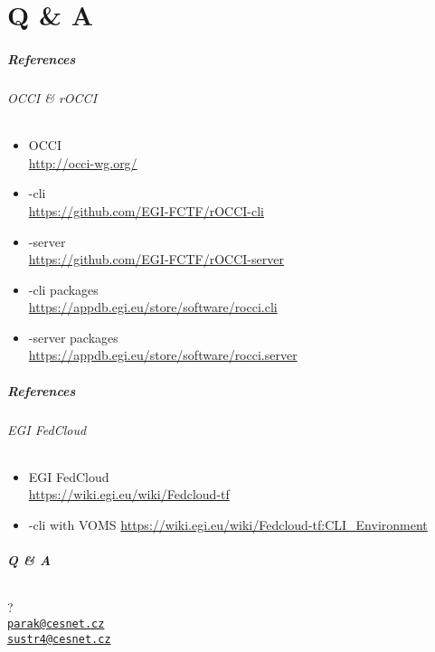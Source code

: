 \part{Q \& A}

\begin{frame}
  \frametitle{References}
  \framesubtitle{OCCI \& rOCCI}

  \begin{itemize}
    \item OCCI \\ \url{http://occi-wg.org/}
    \item \rocci-cli \\ \url{https://github.com/EGI-FCTF/rOCCI-cli}
    \item \rocci-server \\ \url{https://github.com/EGI-FCTF/rOCCI-server}
    \item \rocci-cli packages \\ \url{https://appdb.egi.eu/store/software/rocci.cli}
    \item \rocci-server packages \\ \url{https://appdb.egi.eu/store/software/rocci.server}
  \end{itemize}
\end{frame}

\begin{frame}
  \frametitle{References}
  \framesubtitle{EGI FedCloud}

  \begin{itemize}
    \item EGI FedCloud \\ \url{https://wiki.egi.eu/wiki/Fedcloud-tf}
    \item \rocci-cli with VOMS \Fontsmaller \url{https://wiki.egi.eu/wiki/Fedcloud-tf:CLI_Environment}
  \end{itemize}
\end{frame}


\begin{frame}
  \frametitle{Q \& A}
  \framesubtitle{}

  \begin{center}
    {\Huge ?}\\
    \href{mailto:parak@cesnet.cz}{\nolinkurl{parak@cesnet.cz}}\\
    \href{mailto:sustr4@cesnet.cz}{\nolinkurl{sustr4@cesnet.cz}}
  \end{center}
\end{frame}
